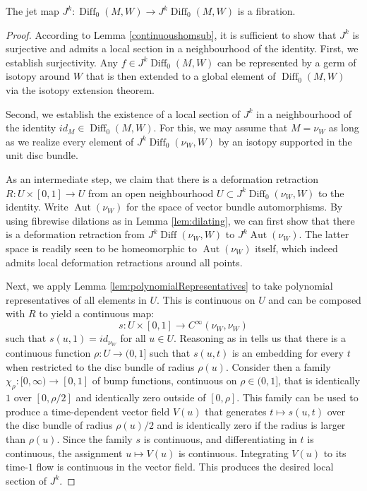 \documentclass[10pt]{amsart}
\newcommand{\Diff}{{\operatorname{Diff}}}
\DeclareMathOperator{\Aut}{Aut}
\numberwithin{theoremalpha}{section}
\numberwithin{equation}{section}
\numberwithin{definition}{section}
\numberwithin{theorem}{section}
\numberwithin{proposition}{section}
\numberwithin{lemma}{section}
\numberwithin{example}{section}
\numberwithin{remark}{section}
\numberwithin{corollary}{section}
\numberwithin{question}{section}
\numberwithin{problem}{section}
\numberwithin{assumption}{section}
\theoremstyle{named}
\numberwithin{equation}{section}
\begin{document}
\begin{lemma} \label{lem:takingJets}
The jet map $J^k : \Diff_0(M,W) \rightarrow J^k\Diff_0(M,W)$ is a fibration.
\end{lemma}
\begin{proof}
According to Lemma \ref{continuoushomsub}, it is sufficient to show that $J^k$ is surjective and admits a local section in a neighbourhood of the identity. First, we establish surjectivity. Any $f \in J^k\Diff_0(M,W)$ can be represented by a germ of isotopy around $W$ that is then extended to a global element of $\Diff_0(M,W)$ via the isotopy extension theorem. 

Second, we establish the existence of a local section of $J^k$ in a neighbourhood of the identity $id_M \in \Diff_0(M,W)$.  For this, we may assume that $M = \nu_{W}$ as long as we realize every element of $J^k\Diff_0(\nu_{W},W)$ by an isotopy supported in the unit disc bundle.

As an intermediate step, we claim that there is a deformation retraction $R : U \times [0,1] \to U$ from an open neighbourhood $U \subset J^k\Diff_0(\nu_{W},W)$ to the identity. Write $\Aut(\nu_{W})$ for the space of vector bundle automorphisms. By using fibrewise dilations as in Lemma \ref{lem:dilating}, we can first show that there is a deformation retraction from $J^k\Diff(\nu_{W},W)$ to $J^k\Aut(\nu_{W})$. The latter space is readily seen to be homeomorphic to $\Aut(\nu_{W})$ itself, which indeed admits local deformation retractions around all points. 

Next, we apply Lemma \ref{lem:polynomialRepresentatives} to take polynomial representatives of all elements in $U$. This is continuous on $U$ and can be composed with $R$ to yield a continuous map:
\[ s: U \times [0,1] \rightarrow C^\infty(\nu_{W},\nu_{W}) \]
such that $s(u,1) = id_{\nu_{W}}$ for all $u \in U$. Reasoning as in \cite[Proposition 31]{Godin} tells us that there is a continuous function $\rho: U \rightarrow (0,1]$ such that $s(u,t)$ is an embedding for every $t$ when restricted to the disc bundle of radius $\rho(u)$. Consider then a family $\chi_\rho: [0,\infty) \rightarrow [0,1]$ of bump functions, continuous on $\rho \in (0,1]$, that is identically $1$ over $[0,\rho/2]$ and identically zero outside of $[0,\rho]$. This family can be used to produce a time-dependent vector field $V(u)$ that generates $t \mapsto s(u,t)$ over the disc bundle of radius $\rho(u)/2$ and is identically zero if the radius is larger than $\rho(u)$. Since the family $s$ is continuous, and differentiating in $t$ is continuous, the assignment $u \mapsto V(u)$ is continuous. Integrating $V(u)$ to its time-$1$ flow is continuous in the vector field. This produces the desired local section of $J^k$. 
\end{proof}
\end{document}
